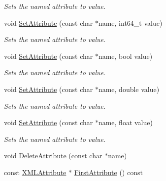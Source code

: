 \begin{DoxyCompactItemize}
\begin{DoxyCompactList}\small\item\em Sets the named attribute to value. \end{DoxyCompactList}\item 
void \hyperlink{classtinyxml2_1_1XMLElement_aaeefdf9171fec91b13a776b42299b0dd}{Set\+Attribute} (const char $\ast$name, int64\+\_\+t value)\hypertarget{classtinyxml2_1_1XMLElement_aaeefdf9171fec91b13a776b42299b0dd}{}\label{classtinyxml2_1_1XMLElement_aaeefdf9171fec91b13a776b42299b0dd}

\begin{DoxyCompactList}\small\item\em Sets the named attribute to value. \end{DoxyCompactList}\item 
void \hyperlink{classtinyxml2_1_1XMLElement_aa848b696e6a75e4e545c6da9893b11e1}{Set\+Attribute} (const char $\ast$name, bool value)\hypertarget{classtinyxml2_1_1XMLElement_aa848b696e6a75e4e545c6da9893b11e1}{}\label{classtinyxml2_1_1XMLElement_aa848b696e6a75e4e545c6da9893b11e1}

\begin{DoxyCompactList}\small\item\em Sets the named attribute to value. \end{DoxyCompactList}\item 
void \hyperlink{classtinyxml2_1_1XMLElement_a233397ee81e70eb5d4b814c5f8698533}{Set\+Attribute} (const char $\ast$name, double value)\hypertarget{classtinyxml2_1_1XMLElement_a233397ee81e70eb5d4b814c5f8698533}{}\label{classtinyxml2_1_1XMLElement_a233397ee81e70eb5d4b814c5f8698533}

\begin{DoxyCompactList}\small\item\em Sets the named attribute to value. \end{DoxyCompactList}\item 
void \hyperlink{classtinyxml2_1_1XMLElement_a554b70d882e65b28fc084b23df9b9759}{Set\+Attribute} (const char $\ast$name, float value)\hypertarget{classtinyxml2_1_1XMLElement_a554b70d882e65b28fc084b23df9b9759}{}\label{classtinyxml2_1_1XMLElement_a554b70d882e65b28fc084b23df9b9759}

\begin{DoxyCompactList}\small\item\em Sets the named attribute to value. \end{DoxyCompactList}\item 
void \hyperlink{classtinyxml2_1_1XMLElement_aebd45aa7118964c30b32fe12e944628a}{Delete\+Attribute} (const char $\ast$name)
\item 
const \hyperlink{classtinyxml2_1_1XMLAttribute}{X\+M\+L\+Attribute} $\ast$ \hyperlink{classtinyxml2_1_1XMLElement_a67593e63558ffda0386699c3e4cc0b2c}{First\+Attribute} () const \hypertarget{classtinyxml2_1_1XMLElement_a67593e63558ffda0386699c3e4cc0b2c}{}\label{classtinyxml2_1_1XMLElement_a67593e63558ffda0386699c3e4cc0b2c}


\end{DoxyCompactItemize}
